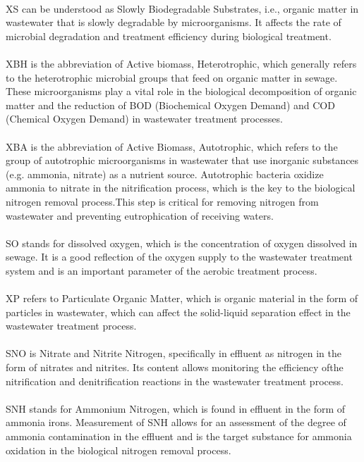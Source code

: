 \documentclass[]{iat}
\begin{document}
\\
XS can be understood as Slowly Biodegradable Substrates, i.e., organic matter in wastewater that is slowly degradable by microorganisms. It affects the rate of microbial degradation and treatment efficiency during biological treatment.\\
\\
XBH is the abbreviation of Active biomass, Heterotrophic, which generally refers to the heterotrophic microbial groups that feed on organic matter in sewage. These microorganisms play a vital role in the biological decomposition of organic matter and the reduction of BOD (Biochemical Oxygen Demand) and COD (Chemical Oxygen Demand) in wastewater treatment processes.\\
\\
XBA is the abbreviation of Active Biomass, Autotrophic, which refers to the group of autotrophic microorganisms in wastewater that use inorganic substances (e.g. ammonia, nitrate) as a nutrient source. Autotrophic bacteria oxidize ammonia to nitrate in the nitrification process, which is the key to the biological nitrogen removal process.This step is critical for removing nitrogen from wastewater and preventing eutrophication of receiving waters.\\
\\
SO stands for dissolved oxygen, which is the concentration of oxygen dissolved in sewage. It is a good reflection of the oxygen supply to the wastewater treatment system and is an important parameter of the aerobic treatment process.\\
\\
XP refers to Particulate Organic Matter, which is organic material in the form of particles in wastewater, which can affect the solid-liquid separation effect in the wastewater treatment process.\\
\\
SNO is Nitrate and Nitrite Nitrogen, specifically in effluent as nitrogen in the form of nitrates and nitrites. Its content allows monitoring the efficiency ofthe nitrification and denitrification reactions in the wastewater treatment process.\\
\\
SNH stands for Ammonium Nitrogen, which is found in effluent in the form of ammonia irons. Measurement of SNH allows for an assessment of the degree of ammonia contamination in the effluent and is the target substance for ammonia oxidation in the biological nitrogen removal process.\\
\end{document}
